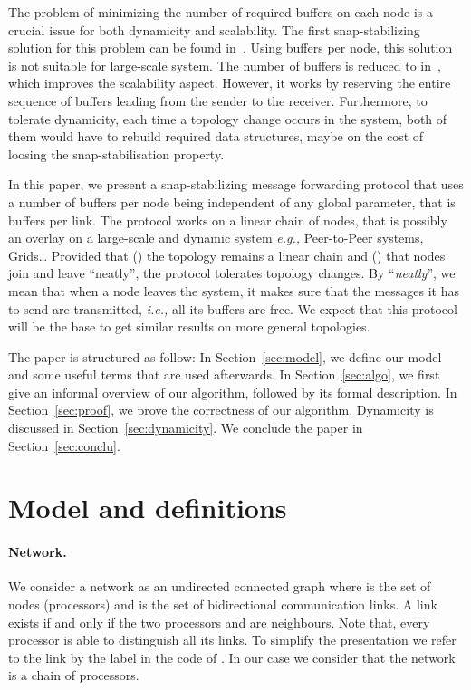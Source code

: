 \documentclass{llncs}
\newcommand{\eg}{\emph{e.g., }}
\newcommand{\ie}{\emph{i.e., }}
\begin{document}
The problem of minimizing the number of required buffers on each node is a crucial issue
for both dynamicity and scalability. 
The first snap-stabilizing solution for this problem can be found in~\cite{CDV09-1}.
Using  buffers per node, this solution is not suitable for large-scale system. 
The number of buffers is reduced to  in~\cite{CDV09-2}, which improves the scalability aspect.  However,
it works by reserving the entire sequence of buffers leading from the sender to the receiver.
Furthermore, to tolerate dynamicity, each time a topology change occurs in the system, 
both of them would have to rebuild required data structures, maybe on the cost of loosing 
the snap-stabilisation property.

In this paper, we present a snap-stabilizing message forwarding protocol that uses 
a number of buffers per node being independent of any global parameter, that is  buffers per 
link. The protocol works on a linear 
chain of nodes, that is possibly an overlay on a large-scale and dynamic system \eg Peer-to-Peer systems, Grids\ldots  
Provided that () the topology remains a linear chain and () that nodes join and leave 
``neatly'', the protocol tolerates topology changes.  By ``{\it neatly}'', we mean that when a node leaves the
system, it makes sure that the messages it has to send are transmitted, \ie all its buffers are free.    
We expect that this protocol will be the base to get similar results on more general topologies. 


The paper is structured as follow: In Section~\ref{sec:model}, we define our model and some useful terms that are used afterwards. 
In Section~\ref{sec:algo}, we first give an informal overview of our algorithm, followed by its formal description. 
In Section~\ref{sec:proof}, we prove the correctness of our algorithm.
Dynamicity is discussed in Section~\ref{sec:dynamicity}. We conclude the paper in Section~\ref{sec:conclu}.  

\section{Model and definitions\label{sec:model}}

\paragraph{\textbf{Network}.} 
We consider a network as an undirected connected graph  where  is the set of nodes (processors) and  is the set of bidirectional communication links. A link  exists if and only if the two processors  and  are neighbours. Note that, every processor is able to distinguish all its links. To simplify the presentation we refer to the link  by the label  in the code of . In our case we consider that the network is a chain of  processors.\\
\end{document}
